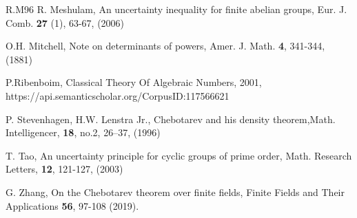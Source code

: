 \documentclass[a4paper,12pt,reqno]{amsart}
\begin{document}
\begin{thebibliography}{{R.M}96}
 R. Meshulam, An uncertainty inequality for finite abelian groups, Eur. J. Comb. {\bf 27 } (1), 63-67, (2006) 

 O.H. Mitchell, Note on determinants of powers, Amer. J. Math. {\bf 4}, 341-344, (1881)


P.Ribenboim, Classical Theory Of Algebraic Numbers, 2001, https://api.semanticscholar.org/CorpusID:117566621


P. Stevenhagen, H.W. Lenstra Jr., Chebotarev and his density theorem,Math. Intelligencer, {\bf 18}, no.2, 26–37, (1996)


T. Tao, An uncertainty principle for cyclic groups of prime order, Math. Research Letters, {\bf 12}, 121-127, (2003)

G. Zhang, On the Chebotarev theorem over finite fields,  Finite Fields and Their Applications {\bf56}, 
97-108 (2019). 

\end{thebibliography}
\end{document}
